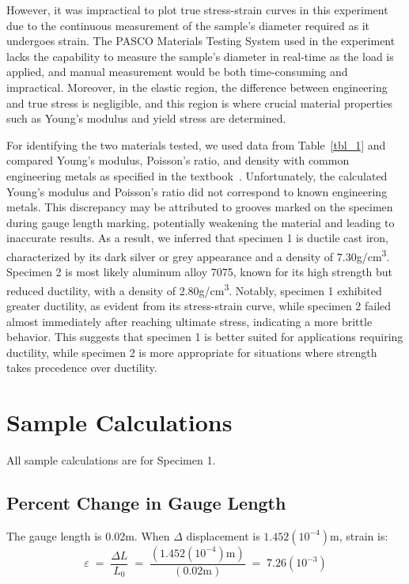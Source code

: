 \documentclass[conference, letterpaper]{IEEEtran}
\begin{document}
    However, it was impractical to plot true stress-strain curves in this experiment due to the continuous measurement of the sample's diameter required as it undergoes strain. 
    The PASCO Materials Testing System used in the experiment lacks the capability to measure the sample's diameter in real-time as the load is applied, and manual measurement would be both time-consuming and impractical. 
    Moreover, in the elastic region, the difference between engineering and true stress is negligible, and this region is where crucial material properties such as Young's modulus and yield stress are determined.

    For identifying the two materials tested, we used data from Table~\ref{tbl_1} and compared Young's modulus, Poisson's ratio, and density with common engineering metals as specified in the textbook~\cite{Hibbeler2022}. 
    Unfortunately, the calculated Young's modulus and Poisson's ratio did not correspond to known engineering metals. 
    This discrepancy may be attributed to grooves marked on the specimen during gauge length marking, potentially weakening the material and leading to inaccurate results. 
    As a result, we inferred that specimen 1 is ductile cast iron, characterized by its dark silver or grey appearance and a density of 7.30g/cm\textsuperscript{3}. 
    Specimen 2 is most likely aluminum alloy 7075, known for its high strength but reduced ductility, with a density of 2.80g/cm\textsuperscript{3}. 
    Notably, specimen 1 exhibited greater ductility, as evident from its stress-strain curve, while specimen 2 failed almost immediately after reaching ultimate stress, indicating a more brittle behavior. 
    This suggests that specimen 1 is better suited for applications requiring ductility, while specimen 2 is more appropriate for situations where strength takes precedence over ductility.




\appendices{}

\section{Sample Calculations}\label{apdx_1}
    All sample calculations are for Specimen 1.
    \subsection{Percent Change in Gauge Length}
        The gauge length is 0.02m. When \(\Delta \) displacement is \(1.452(10^{-4})\)m, strain is:
        \[
            \varepsilon \;
            =\; \frac{\Delta L}{L_0} \;
            =\; \frac{(1.452(10^{-4})\text{m})}{(0.02\text{m})} \;
            =\; 7.26(10^{-3})
        \]
\end{document}
